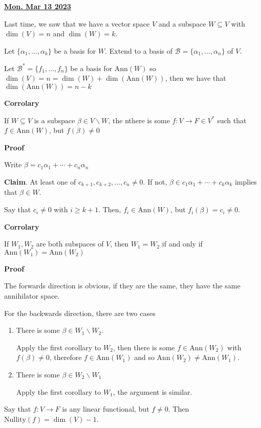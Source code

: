 \documentclass[12pt]{article}
\newcommand{\nullity}{\mathrm{Nullity}}
\def\Ann{\text{Ann}}
\def\B{\mathcal B}
\renewcommand{\date}[1]{\underline{\bf #1}}
\begin{document}
  \date {Mon. Mar 13 2023}


  Last time, we saw that we have a vector space $V$ and a subspace $W
  \subseteq V$ with $\dim(V) = n$ and $\dim(W) = k$.

  Let $\{\alpha_1, \dots, \alpha_k\}$ be a basis for $W$. Extend to a basis of
  $\B = \{\alpha_1, \dots, \alpha_n\}$ of $V$.

  Let $\B^* = \{f_1, \dots, f_n\}$ be a basis for $\Ann(W)$ so $\dim(V) = n =
  \dim(W) + \dim(\Ann(W))$, then we have that $\dim(\Ann(W)) = n - k$


  {\bf Corrolary}

  If $W \subseteq V$ is a subspace $\beta \in V \backslash W$, the nthere is
  some $f: V \to F \in V^*$  such that $f \in \Ann(W)$, but $f(\beta) \ne 0$

  {\bf Proof}

  Write $\beta = c_1 \alpha_1 + \cdots + c_n \alpha_n$

  {\bf Claim}. At least one of $c_{k + 1}, c_{k + 2}, \dots, c_n \ne 0$. If not,
  $\beta \in c_1 \alpha_1 + \cdots + c_k \alpha_k$ implies that $\beta \in W$.

  Say that $c_i \ne 0$ with $i \ge k + 1$. Then, $f_i \in \Ann(W)$, but
  $f_i(\beta) = c_i \ne 0$.


  {\bf Corrolary}

  If $W_1, W_2$ are both subspaces of $V$, then $W_1 = W_2$ if and only if
  $\Ann(W_1) = \Ann(W_2)$

  {\bf Proof}

  The forwards direction is obvious, if they are the same, they have the same
  annihilator space.

  For the backwards direction, there are two cases

  \begin{enumerate}
    \item There is some $\beta \in W_1 \backslash W_2$.

      Apply the first corollary to $W_2$, then there is some $f \in \Ann(W_2)$
      with $f(\beta) \ne 0$, therefore $f \in \Ann(W_1)$ and so $\Ann(W_2) \ne
      \Ann(W_1)$.

    \item There is some $\beta \in W_2 \backslash W_1$

      Apply the first corollary to $W_1$, the argument is similar.
  \end{enumerate}

  Say that $f: V \to F$ is any linear functional, but $f \ne 0$. Then
  $\nullity(f) = \dim(V) - 1$.
\end{document}
